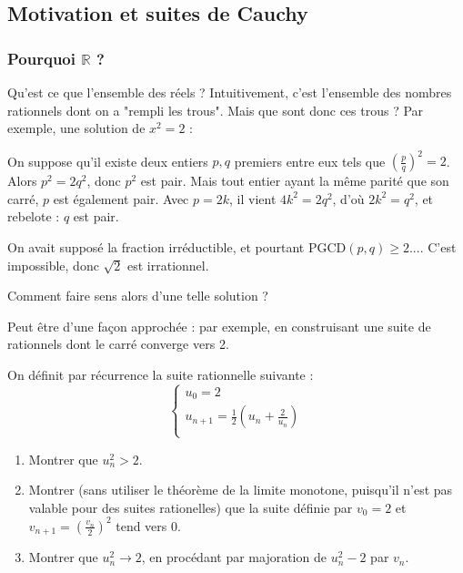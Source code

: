 \subsection{Motivation et suites de Cauchy}
\subsubsection{Pourquoi $\mathbb{R}$ ?}
Qu'est ce que l'ensemble des réels ? 
Intuitivement, c'est l'ensemble des nombres rationnels dont on a "rempli les trous". Mais que sont donc ces trous ? Par exemple, une solution de $x^2=2$ :

\medskip
\begin{tcolorbox}[coltitle=black, colframe=blue!50!green!20!white, colback=white, adjusted title=Une preuve de l'irrationnalité de $\sqrt{2}$]
    On suppose qu'il existe deux entiers $p,q$ premiers entre eux tels que $\left(\frac{p}{q}\right)^{2}=2$. Alors $p^2=2q^2$, donc $p^2$ est pair. Mais tout entier ayant la même parité que son carré, $p$ est également pair. Avec $p=2k$, il vient $4k^2=2q^2$, d'où $2k^2=q^2$, et rebelote : $q$ est pair.

    On avait supposé la fraction irréductible, et pourtant $\mathrm{PGCD}(p,q) \geq 2...$. C'est impossible, donc $\sqrt{2}$ est irrationnel.
\end{tcolorbox}
\medskip

Comment faire sens alors d'une telle solution ?

Peut être d'une façon approchée : par exemple, en construisant une suite de rationnels dont le carré converge vers 2. 

\begin{exo}
    On définit par récurrence la suite rationnelle suivante :
$$\begin{cases}
u_0=2\\
u_{n+1}= \frac{1}{2}(u_n+\frac{2}{u_n})\\
\end{cases}$$
\begin{enumerate}[font=\color{blue!50!green}]
    \item Montrer que $u_n^2>2$.
    \item Montrer (sans utiliser le théorème de la limite monotone, puisqu'il n'est pas valable pour des suites rationelles) que la suite définie par $v_0=2$ et $v_{n+1}=(\frac{v_n}{2})^2$ tend vers 0.
    \item Montrer que $u_n^2 \to 2$, en procédant par majoration de $u_n^2-2$ par $v_n$.
\end{enumerate}
\end{exo}

